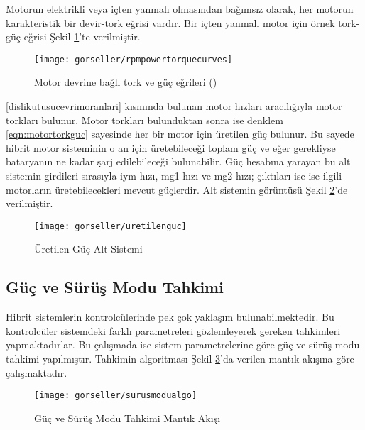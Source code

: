 Motorun elektrikli veya içten yanmalı olmasından bağımsız olarak, her motorun karakteristik bir devir-tork eğrisi vardır. Bir içten yanmalı motor için örnek tork-güç eğrisi Şekil \ref{fig:rpmpowertorquecurves}'te verilmiştir. 

\begin{figure}[h]
    \centering
    \texttt{[image: gorseller/rpmpowertorquecurves]}
    \caption{Motor devrine bağlı tork ve güç eğrileri (\cite{engpowertorquecurve})}\label{fig:rpmpowertorquecurves}
\end{figure}

\ref{dislikutusucevrimoranlari} kısmında bulunan motor hızları aracılığıyla motor torkları bulunur. Motor torkları bulunduktan sonra ise denklem \ref{eqn:motortorkguc} sayesinde her bir motor için üretilen güç bulunur. 
Bu sayede hibrit motor sisteminin o an için üretebileceği toplam güç ve eğer gerekliyse bataryanın ne kadar şarj edilebileceği bulunabilir. Güç hesabına yarayan bu alt sistemin girdileri sırasıyla 
 \acrshort{iym} hızı, \acrshort{mg1} hızı ve \acrshort{mg2} hızı; çıktıları ise ise ilgili motorların üretebilecekleri mevcut güçlerdir. Alt sistemin görüntüsü Şekil \ref{fig:uretilenguc}'de verilmiştir.

\begin{figure}[h]
    \centering
    \texttt{[image: gorseller/uretilenguc]}
    \caption{Üretilen Güç Alt Sistemi}\label{fig:uretilenguc}
\end{figure}

\subsection{Güç ve Sürüş Modu Tahkimi}
\label{gucvesurusmodutahkimi}

Hibrit sistemlerin kontrolcülerinde pek çok yaklaşım bulunabilmektedir. Bu kontrolcüler sistemdeki farklı parametreleri gözlemleyerek gereken tahkimleri yapmaktadırlar.
Bu çalışmada ise sistem parametrelerine göre güç ve sürüş modu tahkimi yapılmıştır. Tahkimin algoritması Şekil \ref{fig:surusmodualgo}'da verilen mantık akışına göre çalışmaktadır.
\begin{figure}[h]
    \centering
    \texttt{[image: gorseller/surusmodualgo]}
    \caption{Güç ve Sürüş Modu Tahkimi Mantık Akışı}\label{fig:surusmodualgo}
\end{figure}

